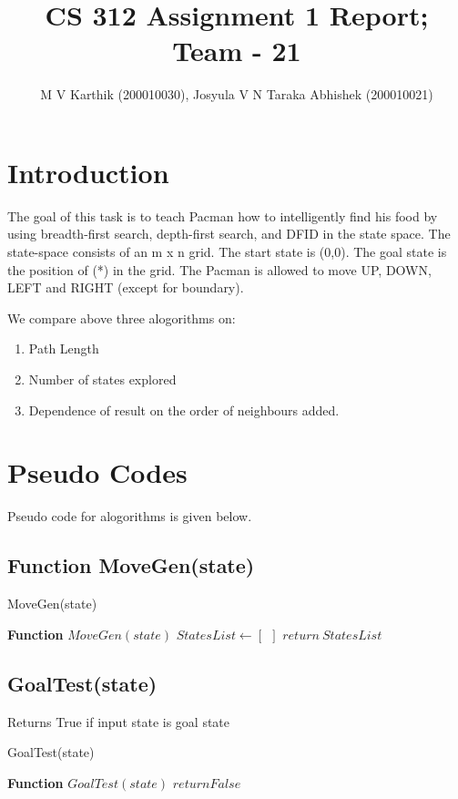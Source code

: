 \documentclass{article}
\title{CS 312 Assignment 1 Report; Team - 21}
\author{M V Karthik (200010030), Josyula V N Taraka Abhishek (200010021)}
\begin{document}
\maketitle

\section{Introduction}
The goal of this task is to teach Pacman how to intelligently find his food by using 
breadth-first search, depth-first search, and DFID in the state space. The state-space consists of
an m x n grid. The start state is (0,0). The goal state is the position of (*) in the grid. The
Pacman is allowed to move UP, DOWN, LEFT and RIGHT (except for boundary).  

We compare above three alogorithms on:
\begin{enumerate}
    \item Path Length
    \item Number of states explored
    \item Dependence of result on the order of neighbours added.
\end{enumerate}

\section{Pseudo Codes}
Pseudo code for  alogorithms is given below.

\subsection{Function MoveGen(state)}


\begin{algorithm}[H]
    \caption{MoveGen(state)}
    \textbf{Function} $MoveGen(state)$ \;
    $StatesList \leftarrow [~~]$\;
    $return ~ StatesList$      
\end{algorithm}

\subsection{GoalTest(state)}
Returns True if input state is goal state
\\
\begin{algorithm}[H]
    \caption{GoalTest(state)}
    \textbf{Function} $GoalTest(state)$ \;
    $return False$
\end{algorithm}
\end{document}
